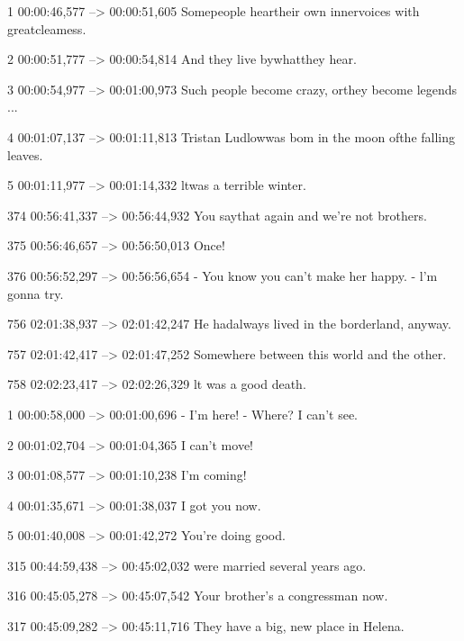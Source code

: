 \begin{subexam}

1
00:00:46,577 --> 00:00:51,605
Somepeople heartheir own
innervoices with greatcleamess.

2
00:00:51,777 --> 00:00:54,814
And they live bywhatthey hear.

3
00:00:54,977 --> 00:01:00,973
Such people become crazy,
orthey become legends ...

4
00:01:07,137 --> 00:01:11,813
Tristan Ludlowwas bom
in the moon ofthe falling leaves.

5
00:01:11,977 --> 00:01:14,332
ltwas a terrible winter.

374
00:56:41,337 --> 00:56:44,932
You saythat again
and we're not brothers.

375
00:56:46,657 --> 00:56:50,013
Once!

376
00:56:52,297 --> 00:56:56,654
- You know you can't make her happy.
- l'm gonna try.

756
02:01:38,937 --> 02:01:42,247
He hadalways lived
in the borderland, anyway.

757
02:01:42,417 --> 02:01:47,252
Somewhere between this world
and the other.

758
02:02:23,417 --> 02:02:26,329
lt was a good death.
\end{subexam}
\hspace{0.5cm}
\begin{subexam}
1
00:00:58,000 --> 00:01:00,696
- I'm here!
- Where? I can't see.

2
00:01:02,704 --> 00:01:04,365
I can't move!

3
00:01:08,577 --> 00:01:10,238
I'm coming!

4
00:01:35,671 --> 00:01:38,037
I got you now.

5
00:01:40,008 --> 00:01:42,272
You're doing good.

315
00:44:59,438 --> 00:45:02,032
were married several years ago.

316
00:45:05,278 --> 00:45:07,542
Your brother's a congressman now.

317
00:45:09,282 --> 00:45:11,716
They have a big, new place
in Helena.
\end{subexam}



